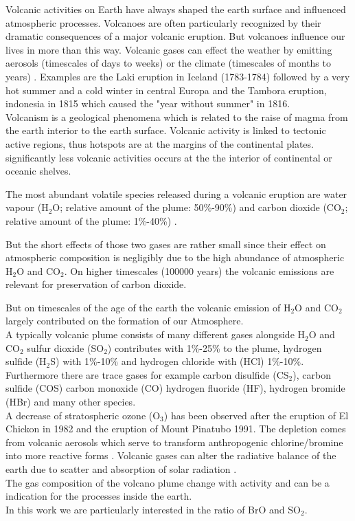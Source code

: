 
Volcanic activities on Earth have always shaped the earth surface and influenced atmospheric processes. Volcanoes are often particularly recognized by their dramatic consequences of a major volcanic eruption. But volcanoes influence our lives in more than this way. Volcanic gases can effect the weather by emitting aerosols (timescales of days to weeks) or the climate (timescales of months to years) \cite{schmidt2015volcanismarticle}.
Examples are the Laki eruption in Iceland (1783-1784) followed by a very hot summer and a cold winter in central Europa \cite{thordarson2003atmospheric} and the Tambora eruption, indonesia in 1815 which caused the "year without summer" in 1816.\\
%
\newline
%
Volcanism is a geological phenomena which is related to the raise of magma  from the earth interior to the earth surface. Volcanic activity is linked to tectonic active regions, thus hotspots are at the margins of the continental plates.
significantly less volcanic activities occurs at the the interior of continental or oceanic shelves. \cite{schmincke2000vulkanismus}

The most abundant volatile species released during a volcanic eruption are water vapour (H$_2$O; relative amount of the plume: 50\%-90\%) and carbon dioxide (CO$_2$; relative amount of the plume: 1\%-40\%) \cite{platt2015quantification}. 

But the short effects of those two gases are rather small since their effect on atmospheric composition is negligibly due to the high abundance of atmospheric H$_2$O and CO$_2$. 
On higher timescales (100000 years) the volcanic emissions are relevant for preservation of carbon dioxide. 

But on timescales of the age of the earth the volcanic emission of H$_2$O and CO$_2$ largely contributed on the formation of our Atmosphere. \cite{schmidt2015volcanism}\\ 

A typically volcanic plume consists of many different gases alongside H$_2$O and CO$_2$  sulfur dioxide (SO$_2$) contributes with 1\%-25\% to the plume, hydrogen sulfide (H$_2$S) with 1\%-10\% and hydrogen chloride with (HCl) 1\%-10\%. Furthermore there are trace gases for example carbon disulfide (CS$_2$), carbon sulfide (COS) carbon monoxide (CO) hydrogen fluoride (HF), hydrogen bromide (HBr) and many other species. \cite{platt2015quantification}\\
%
A decrease of stratospheric ozone (O$_3$) has been observed after the eruption of  El Chickon in 1982 and the eruption of Mount Pinatubo 1991. The depletion comes from volcanic aerosols which serve to transform anthropogenic chlorine/bromine into more reactive forms \cite{solomon1998ozone}. 
%
Volcanic gases can alter the radiative balance of the earth due to scatter and absorption of solar radiation \cite{schmidt2015volcanism}.\\
%
The gas composition of the volcano plume change with activity and can be a indication for the processes inside the earth.\\ 
%
In this work we are particularly interested in the ratio of BrO and SO$_2$.
 
